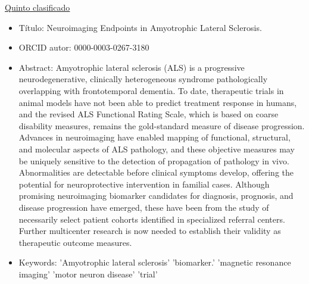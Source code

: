 \documentclass[size=a4, parskip=half, titlepage=false, toc=flat, toc=bib, 12pt]{scrartcl}
\theoremstyle{theorem-style}
\theoremstyle{definition-style}
\theoremstyle{remark-style}
\theoremstyle{example-style}
\theoremstyle{definition-style}
\theoremstyle{remark-style}
\begin{document}
\underline{Quinto clasificado}
\begin{itemize}
\item Título: Neuroimaging Endpoints in Amyotrophic Lateral Sclerosis.
\item ORCID autor: 0000-0003-0267-3180
\item Abstract: Amyotrophic lateral sclerosis (ALS) is a progressive neurodegenerative, clinically heterogeneous syndrome pathologically overlapping with frontotemporal dementia. To date, therapeutic trials in animal models have not been able to predict treatment response in humans, and the revised ALS Functional Rating Scale, which is based on coarse disability measures, remains the gold-standard measure of disease progression. Advances in neuroimaging have enabled mapping of functional, structural, and molecular aspects of ALS pathology, and these objective measures may be uniquely sensitive to the detection of propagation of pathology in vivo. Abnormalities are detectable before clinical symptoms develop, offering the potential for neuroprotective intervention in familial cases. Although promising neuroimaging biomarker candidates for diagnosis, prognosis, and disease progression have emerged, these have been from the study of necessarily select patient cohorts identified in specialized referral centers. Further multicenter research is now needed to establish their validity as therapeutic outcome measures.
\item Keywords: 'Amyotrophic lateral sclerosis' 'biomarker.'
  'magnetic resonance imaging' 'motor neuron disease' 'trial'
\end{itemize}
\end{document}
